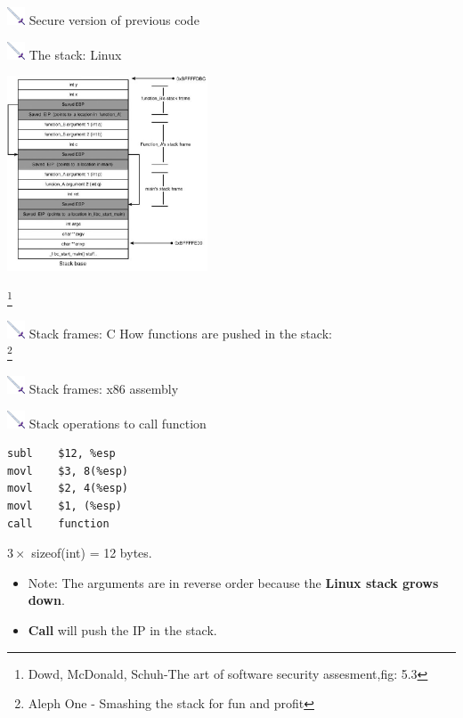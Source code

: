\documentclass{beamer}
\newcommand{\sword}{\includegraphics[width=15pt]{sword.png} \hspace*{5pt}}
\begin{document}
\begin{frame}{\sword Secure version of previous code}
  
\end{frame}

\begin{frame}{\sword The stack: Linux}
  \begin{center}
    \includegraphics[height=5.8cm]{linux_stackbase.png}
  \end{center}
  \let\thefootnote\relax\footnote{\tiny Dowd, McDonald, Schuh-The art of software security assesment,fig: 5.3}
\end{frame}
\begin{frame}{\sword Stack frames: C}
  How functions are pushed in the stack: \\[0.2cm]
  
  \let\thefootnote\relax\footnote{\tiny Aleph One - Smashing the stack for fun and profit}
\end{frame}

\begin{frame}{\sword Stack frames: x86 assembly}
  
\end{frame}
\begin{frame}[fragile]{\sword Stack operations to call function}
  \begin{center}
    \begin{minipage}{4.5cm}
      \begin{lstlisting}[style=cstyle]
subl	$12, %esp
movl	$3, 8(%esp)
movl	$2, 4(%esp)
movl	$1, (%esp)
call	function
      \end{lstlisting}
    \end{minipage}
    \begin{minipage}{4.5cm}
$3 \times $ sizeof(int) = 12 bytes.
    \end{minipage}
  \end{center}

  \vspace*{0.3cm}
  \begin{itemize}
  \item Note: The arguments are in reverse order because the \textbf{Linux stack grows down}.
  \item \textbf{Call} will push the IP in the stack.
  \end{itemize}
\end{frame}
\end{document}
